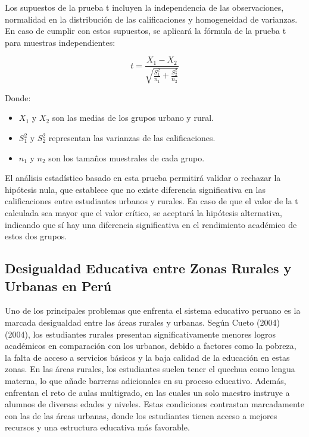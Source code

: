 \documentclass[
]{article}
\begin{document}
Los supuestos de la prueba t incluyen la independencia de las
observaciones, normalidad en la distribución de las calificaciones y
homogeneidad de varianzas. En caso de cumplir con estos supuestos, se
aplicará la fórmula de la prueba t para muestras independientes:

\[
t = \frac{X_1 - X_2}{\sqrt{\frac{S_1^2}{n_1} + \frac{S_2^2}{n_2}}}
\]

Donde:

\begin{itemize}
    \item $X_1$ y $X_2$ son las medias de los grupos urbano y rural.
    \item $S_1^2$ y $S_2^2$ representan las varianzas de las calificaciones.
    \item $n_1$ y $n_2$ son los tamaños muestrales de cada grupo.
\end{itemize}

El análisis estadístico basado en esta prueba permitirá validar o
rechazar la hipótesis nula, que establece que no existe diferencia
significativa en las calificaciones entre estudiantes urbanos y rurales.
En caso de que el valor de la t calculada sea mayor que el valor
crítico, se aceptará la hipótesis alternativa, indicando que sí hay una
diferencia significativa en el rendimiento académico de estos dos
grupos.

\subsection*{Desigualdad Educativa entre Zonas Rurales y Urbanas en
Perú}\label{desigualdad-educativa-entre-zonas-rurales-y-urbanas-en-peruxfa}

\vspace{0.5cm}

Uno de los principales problemas que enfrenta el sistema educativo
peruano es la marcada desigualdad entre las áreas rurales y urbanas.
Según Cueto (2004) (2004), los estudiantes rurales presentan
significativamente menores logros académicos en comparación con los
urbanos, debido a factores como la pobreza, la falta de acceso a
servicios básicos y la baja calidad de la educación en estas zonas. En
las áreas rurales, los estudiantes suelen tener el quechua como lengua
materna, lo que añade barreras adicionales en su proceso educativo.
Además, enfrentan el reto de aulas multigrado, en las cuales un solo
maestro instruye a alumnos de diversas edades y niveles. Estas
condiciones contrastan marcadamente con las de las áreas urbanas, donde
los estudiantes tienen acceso a mejores recursos y una estructura
educativa más favorable.
\end{document}

